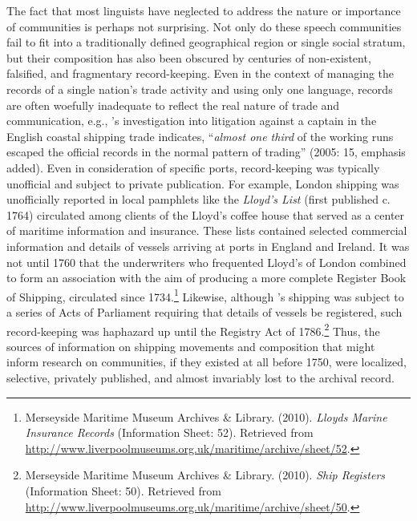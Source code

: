 The fact that most linguists have neglected to address the nature or importance of  communities is perhaps not surprising. Not only do these speech communities fail to fit into a traditionally defined geographical region or single social stratum, but their composition has also been obscured by centuries of non-existent, falsified, and fragmentary record-keeping. Even in the context of managing the records of a single nation’s trade activity and using only one language, records are often woefully inadequate to reflect the real nature of trade and communication, e.g., \citeauthor{Cook2005}’s investigation into  litigation against a captain in the English coastal shipping trade indicates, “\textit{almost one third} of the working runs escaped the official records in the normal pattern of trading” (2005: 15, emphasis added). Even in consideration of specific ports, record-keeping was typically unofficial and subject to private publication. For example, London shipping was unofficially reported in local pamphlets like the \textit{Lloyd's List} (first published c. 1764) circulated among clients of the Lloyd’s coffee house that served as a center of maritime information and insurance. These lists contained selected commercial information and details of vessels arriving at ports in England and Ireland. It was not until 1760 that the underwriters who frequented Lloyd’s of London combined to form an association with the aim of producing a more complete Register Book of Shipping, circulated since 1734.\footnote{Merseyside Maritime Museum Archives \& Library. (2010).  \textit{Lloyds Marine Insurance Records} (Information Sheet: 52). Retrieved from \url{http://www.liverpoolmuseums.org.uk/maritime/archive/sheet/52}.} Likewise, although ’s shipping was subject to a series of Acts of Parliament requiring that details of vessels be registered, such record-keeping was haphazard up until the Registry Act of 1786.\footnote{Merseyside Maritime Museum Archives \& Library. (2010).  \textit{ Ship Registers} (Information Sheet: 50). Retrieved from \url{http://www.liverpoolmuseums.org.uk/maritime/archive/sheet/50}.} Thus, the sources of information on shipping movements and  composition that might inform research on  communities, if they existed at all before 1750, were localized, selective, privately published, and almost invariably lost to the archival record. 

